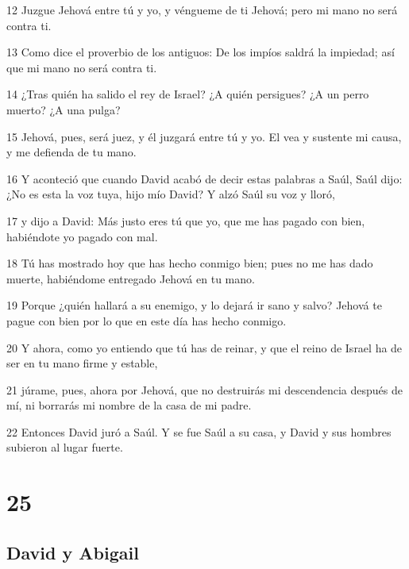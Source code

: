 \par 12 Juzgue Jehová entre tú y yo, y véngueme de ti Jehová; pero mi mano no será contra ti.
\par 13 Como dice el proverbio de los antiguos: De los impíos saldrá la impiedad; así que mi mano no será contra ti.
\par 14 ¿Tras quién ha salido el rey de Israel? ¿A quién persigues? ¿A un perro muerto? ¿A una pulga?
\par 15 Jehová, pues, será juez, y él juzgará entre tú y yo. El vea y sustente mi causa, y me defienda de tu mano.
\par 16 Y aconteció que cuando David acabó de decir estas palabras a Saúl, Saúl dijo: ¿No es esta la voz tuya, hijo mío David? Y alzó Saúl su voz y lloró,
\par 17 y dijo a David: Más justo eres tú que yo, que me has pagado con bien, habiéndote yo pagado con mal.
\par 18 Tú has mostrado hoy que has hecho conmigo bien; pues no me has dado muerte, habiéndome entregado Jehová en tu mano.
\par 19 Porque ¿quién hallará a su enemigo, y lo dejará ir sano y salvo? Jehová te pague con bien por lo que en este día has hecho conmigo.
\par 20 Y ahora, como yo entiendo que tú has de reinar, y que el reino de Israel ha de ser en tu mano firme y estable,
\par 21 júrame, pues, ahora por Jehová, que no destruirás mi descendencia después de mí, ni borrarás mi nombre de la casa de mi padre.
\par 22 Entonces David juró a Saúl. Y se fue Saúl a su casa, y David y sus hombres subieron al lugar fuerte.

\chapter{25}

\section*{David y Abigail}

